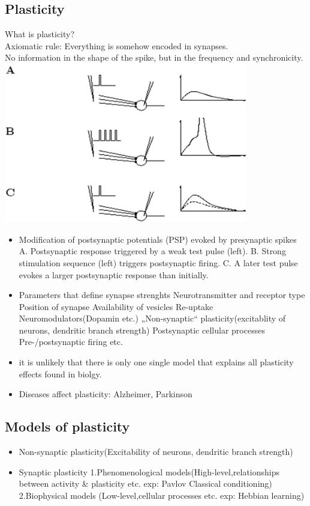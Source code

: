 \documentclass[english,11pt]{article}
\begin{document}
\subsection{Plasticity}
What is plasticity?\\
Axiomatic rule: Everything is somehow encoded in synapses.\\
No information in the shape of the spike, but in the frequency and synchronicity.\\
\includegraphics[width=0.8\textwidth]{plasticity.png}
\begin{itemize}
\item Modification of postsynaptic potentials (PSP) evoked by presynaptic spikes
\subitem A. Postsynaptic response triggered by a weak test pulse (left).
\subitem B. Strong stimulation sequence (left) triggers postsynaptic firing.
\subitem C. A later test pulse evokes a larger postsynaptic response than initially.
\item Parameters that define synapse strenghts
\subitem Neurotransmitter and receptor type
\subitem Position of synapse
\subitem Availability of vesicles
\subitem Re-uptake
\subitem Neuromodulators(Dopamin etc.)
\subitem „Non-synaptic“ plasticity(excitablity of neurons, dendritic branch strength)
\subitem Postsynaptic cellular processes
\subitem Pre-/postsynaptic firing
\subitem etc.
\item it is unlikely that there is only one single model that explains all plasticity effects found in biolgy.
\item Diseases affect plasticity: Alzheimer, Parkinson
\end{itemize}


\subsection{Models of plasticity}
\begin{itemize}
\item Non-synaptic plasticity(Excitability of neurons, dendritic branch strength)
\item Synaptic plasticity
\subitem 1.Phenomenological models(High-level,relationships between activity \& plasticity etc. exp: Pavlov Classical conditioning)
\subitem 2.Biophysical models (Low-level,cellular processes etc. exp: Hebbian learning)
\end{itemize}
\end{document}
